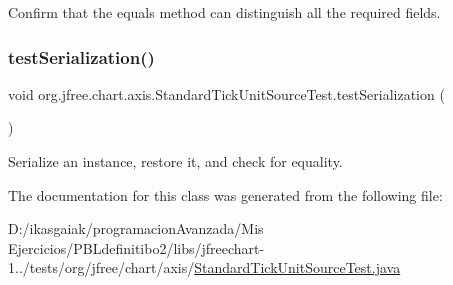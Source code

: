 Confirm that the equals method can distinguish all the required fields. \mbox{\label{classorg_1_1jfree_1_1chart_1_1axis_1_1_standard_tick_unit_source_test_a86e615295f4cbb3faebad7e2a2c09790}} 
\subsubsection{\texorpdfstring{test\+Serialization()}{testSerialization()}}
{\footnotesize\ttfamily void org.\+jfree.\+chart.\+axis.\+Standard\+Tick\+Unit\+Source\+Test.\+test\+Serialization (\begin{DoxyParamCaption}{ }\end{DoxyParamCaption})}

Serialize an instance, restore it, and check for equality. 

The documentation for this class was generated from the following file\+:\begin{DoxyCompactItemize}
\item 
D\+:/ikasgaiak/programacion\+Avanzada/\+Mis Ejercicios/\+P\+B\+Ldefinitibo2/libs/jfreechart-\/1../tests/org/jfree/chart/axis/\mbox{\hyperlink{_standard_tick_unit_source_test_8java}{Standard\+Tick\+Unit\+Source\+Test.\+java}}\end{DoxyCompactItemize}
